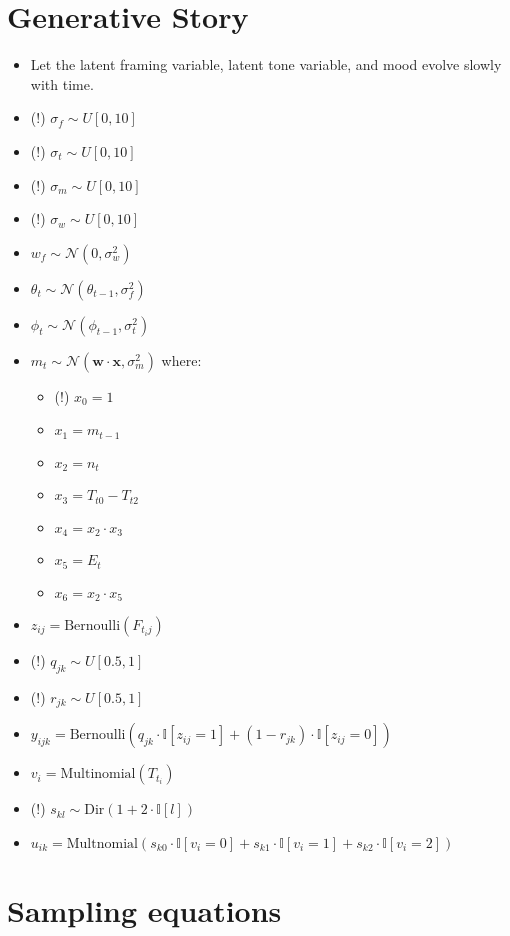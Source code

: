 \documentclass[11pt]{article}
\theoremstyle{plain}
\theoremstyle{definition}
\begin{document}
\section{Generative Story}

\begin{itemize}
\item Let the latent framing variable, latent tone variable, and mood evolve slowly with time.
\item (!) $\sigma_f \sim U[0, 10]$
\item (!) $\sigma_t \sim U[0, 10]$
\item (!) $\sigma_m \sim U[0, 10]$
\item (!) $\sigma_w \sim U[0, 10]$
\item $w_f \sim \mathcal{N}(0, \sigma_w^2)$
\item $\theta_t \sim \mathcal{N}(\theta_{t-1}, \sigma_f^2)$
\item $\phi_t \sim \mathcal{N}(\phi_{t-1}, \sigma_t^2)$
\item $m_t \sim \mathcal{N}(\mathbf{w} \cdot \mathbf{x}, \sigma_m^2)$ where:
\begin{itemize}
\item (!) $x_0 = 1$
\item $x_1 = m_{t-1}$
\item $x_2 = n_t$
\item $x_3 = T_{t0} - T_{t2}$
\item $x_4 = x_2 \cdot x_3$
\item $x_5 = E_t$
\item $x_6 = x_2 \cdot x_5$
\end{itemize}
\item $z_{ij} = \textrm{Bernoulli}(F_{t_i j})$
\item (!) $q_{jk} \sim U[0.5, 1]$
\item (!) $r_{jk} \sim U[0.5, 1]$
\item $y_{ijk} = \textrm{Bernoulli}\left( q_{jk} \cdot \mathbb{I}[{z_{ij}}=1] + (1-r_{jk}) \cdot \mathbb{I}[z_{ij} = 0]\right)$
\item $v_{i} = \textrm{Multinomial}(T_{t_i})$
\item (!) $s_{kl} \sim \textrm{Dir}(1 + 2 \cdot \mathbb{I}[l])$
\item $u_{ik} = \textrm{Multnomial}(s_{k0} \cdot \mathbb{I}[v_i = 0] + s_{k1} \cdot \mathbb{I}[v_i = 1] + s_{k2} \cdot \mathbb{I}[v_i = 2]) $

\end{itemize}

\section{Sampling equations}
\end{document}
